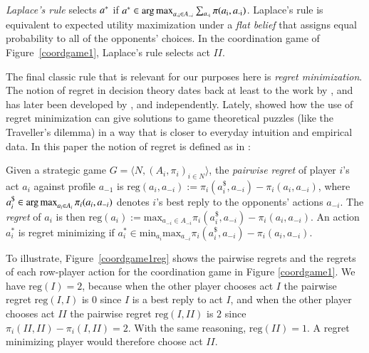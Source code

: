 \documentclass[fleqn,reqno,11pt]{article}
\begin{document}
\emph{Laplace's rule} selects $a^*$ if
$a^* \in \operatorname*{arg\,max}_{a_{\text{-i}} \in A_{-i}} \sum_{a_{\text{-i}}} \pi(a_{\text{i}}, a_{\text{-i}})$.
Laplace's rule is equivalent to expected utility maximization under a \emph{flat belief} that
assigns equal probability to all of the opponents' choices. In the coordination game of
Figure~\ref{coordgame1}, Laplace's rule selects act $II$.

The final classic rule that is relevant for our purposes here is \emph{regret
  minimization}. The notion of regret in decision theory dates back at least to the work by
\citet{Savage1951:The-theory-of-s}, and has later been developed by \citet{bell82}, \citet{fish82} and \citet{loosug82} independently. Lately,
\citet{HalpernPass2012:Iterated-Regret} showed how the use of regret minimization can give
solutions to game theoretical puzzles (like the Traveller's dilemma) in a way that is closer to
everyday intuition and empirical data. In this paper the notion of regret is defined as in
\citet{HalpernPass2012:Iterated-Regret}:

\begin{definition} \label{defn:regret} Given a strategic game
  $ G=\langle N, (A_i , \pi_i)_{i \in N} \rangle $, the \emph{pairwise regret} of player $i$'s
  act $a_i$ against profile $a_{-1}$ is
  $\text{reg}(a_i,a_{-i}):= \pi_i(a_i^\$,a_{-i})-\pi_i(a_i,a_{-i}) $, where
  $a_i^\$ \in \operatorname*{arg\,max}_{a_i \in A_i} \pi_i(a_i, a_{-i})$ denotes $i$'s best reply to the
  opponents' actions $a_{-i}$. The \emph{regret} of $a_i$ is then
  $\text{reg}(a_i):= \text{max}_{a_{-i}\in A_{-i}} \pi_i(a_i^\$,a_{-i})-\pi_i(a_i,a_{-i}) $. An
  action $a^{*}_i $ is regret minimizing if
  $a^{*}_i \in \text{min}_{a_i} \text{max}_{a_{-i}} \pi_i(a_i^\$,a_{-i})-\pi_i(a_i,a_{-i}) $.
\end{definition}


To illustrate, Figure~\ref{coordgame1reg} shows the pairwise regrets and the regrets of each
row-player action for the coordination game in Figure \ref{coordgame1}. We have
$\text{reg}(I)=2$, because when the other player chooses act $I$ the pairwise regret
$\text{reg}(I,I)$ is $0$ since $I$ is a best reply to act $I$, and when the other player
chooses act $II$ the pairwise regret $\text{reg}(I, II)$ is $2$ since
$\pi_i(II,II)-\pi_i(I,II)=2$. With the same reasoning, $\text{reg}(II)=1$. A regret minimizing
player would therefore choose act $II$.
\end{document}
